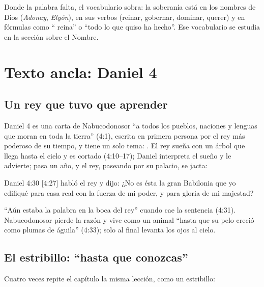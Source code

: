 
Donde la palabra falta, el vocabulario sobra: la soberanía está en los nombres de Dios (\emph{Adonay}, \emph{Elyón}), en sus verbos (reinar, gobernar, dominar, querer) y en fórmulas como ``\SENOR{} reina'' o ``todo lo que quiso ha hecho''. Ese vocabulario se estudia en la sección sobre el Nombre.

\section{Texto ancla: Daniel 4}

\subsection{Un rey que tuvo que aprender}
Daniel 4 es una carta de Nabucodonosor ``a todos los pueblos, naciones y lenguas que moran en toda la tierra'' (4:1), escrita en primera persona por el rey más poderoso de su tiempo, y tiene un solo tema: . El rey sueña con un árbol que llega hasta el cielo y es cortado (4:10--17); Daniel interpreta el sueño y le advierte; pasa un año, y el rey, paseando por su palacio, se jacta:

\begin{verso}{Daniel 4:30 [4:27]}
habló el rey y dijo: ¿No es ésta la gran Babilonia que yo edifiqué para casa real con la fuerza de mi poder, y para gloria de mi majestad?
\end{verso}

``Aún estaba la palabra en la boca del rey'' cuando cae la sentencia (4:31). Nabucodonosor pierde la razón y vive como un animal ``hasta que su pelo creció como plumas de águila'' (4:33); solo al final levanta los ojos al cielo.


\subsection{El estribillo: “hasta que conozcas”}
Cuatro veces repite el capítulo la misma lección, como un estribillo:

